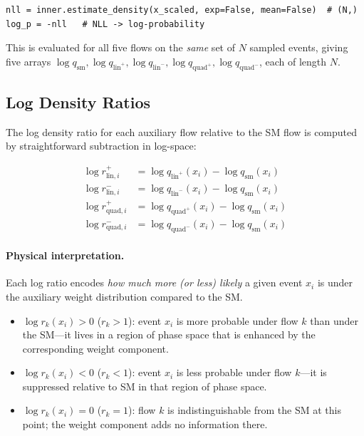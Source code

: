 \documentclass[11pt,a4paper]{article}
\begin{document}
\begin{lstlisting}
nll = inner.estimate_density(x_scaled, exp=False, mean=False)  # (N,)
log_p = -nll   # NLL -> log-probability
\end{lstlisting}

This is evaluated for all five flows on the \emph{same} set of $N$ sampled events, giving five
arrays $\log q_{\text{sm}}, \log q_{\text{lin}^+}, \log q_{\text{lin}^-},
\log q_{\text{quad}^+}, \log q_{\text{quad}^-}$, each of length $N$.

\subsection{Log Density Ratios}

\label{sec:logr}

The log density ratio for each auxiliary flow relative to the SM flow is computed by straightforward
subtraction in log-space:

\begin{equation}
\begin{aligned}
\log r_{\text{lin},i}^{+}   &= \log q_{\text{lin}^+}(x_i) - \log q_{\text{sm}}(x_i) \\
\log r_{\text{lin},i}^{-}   &= \log q_{\text{lin}^-}(x_i) - \log q_{\text{sm}}(x_i) \\
\log r_{\text{quad},i}^{+}  &= \log q_{\text{quad}^+}(x_i) - \log q_{\text{sm}}(x_i) \\
\log r_{\text{quad},i}^{-}  &= \log q_{\text{quad}^-}(x_i) - \log q_{\text{sm}}(x_i)
\end{aligned}
\end{equation}

\paragraph{Physical interpretation.}
Each log ratio encodes \emph{how much more (or less) likely} a given event $x_i$ is under the
auxiliary weight distribution compared to the SM.

\begin{itemize}
  \item $\log r_k(x_i) > 0$ ($r_k > 1$): event $x_i$ is more probable under flow $k$ than under
        the SM---it lives in a region of phase space that is enhanced by the corresponding weight
        component.
  \item $\log r_k(x_i) < 0$ ($r_k < 1$): event $x_i$ is less probable under flow $k$---it is
        suppressed relative to SM in that region of phase space.
  \item $\log r_k(x_i) = 0$ ($r_k = 1$): flow $k$ is indistinguishable from the SM at this point;
        the weight component adds no information there.
\end{itemize}
\end{document}
